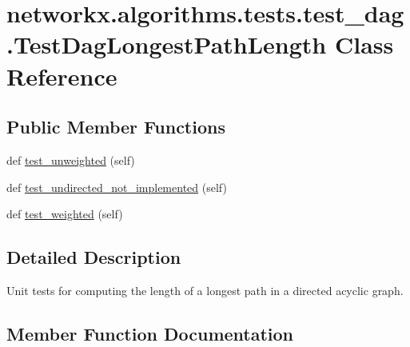 \hypertarget{classnetworkx_1_1algorithms_1_1tests_1_1test__dag_1_1TestDagLongestPathLength}{}\section{networkx.\+algorithms.\+tests.\+test\+\_\+dag.\+Test\+Dag\+Longest\+Path\+Length Class Reference}
\label{classnetworkx_1_1algorithms_1_1tests_1_1test__dag_1_1TestDagLongestPathLength}
\subsection*{Public Member Functions}
\begin{DoxyCompactItemize}
\item 
def \hyperlink{classnetworkx_1_1algorithms_1_1tests_1_1test__dag_1_1TestDagLongestPathLength_a09ce1639fb0899bd90da33823d503945}{test\+\_\+unweighted} (self)
\item 
def \hyperlink{classnetworkx_1_1algorithms_1_1tests_1_1test__dag_1_1TestDagLongestPathLength_a4e84361281414569da5e9948c4b1a874}{test\+\_\+undirected\+\_\+not\+\_\+implemented} (self)
\item 
def \hyperlink{classnetworkx_1_1algorithms_1_1tests_1_1test__dag_1_1TestDagLongestPathLength_a02ce711c33c156c99c81f69f9674938e}{test\+\_\+weighted} (self)
\end{DoxyCompactItemize}


\subsection{Detailed Description}
\begin{DoxyVerb}Unit tests for computing the length of a longest path in a
directed acyclic graph.\end{DoxyVerb}
 

\subsection{Member Function Documentation}
\mbox{\label{classnetworkx_1_1algorithms_1_1tests_1_1test__dag_1_1TestDagLongestPathLength_a4e84361281414569da5e9948c4b1a874}} 
